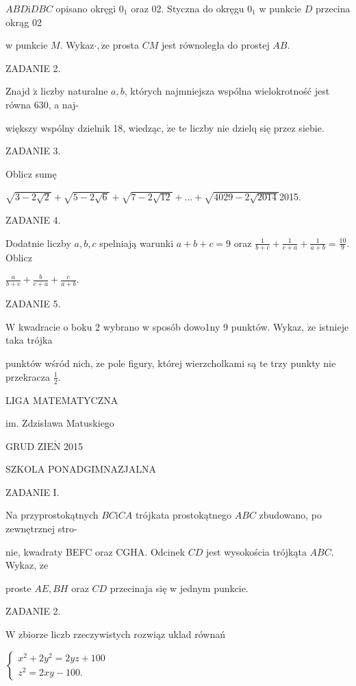 \documentclass[a4paper,12pt]{article}
\begin{document}
$ABD\mathrm{i}DBC$ opisano okręgi $0_{1}$ oraz 02. Styczna do okręgu $0_{1}$ w punkcie $D$ przecina okrąg 02

w punkcie $M$. Wykaz$\cdot, \dot{\mathrm{z}}\mathrm{e}$ prosta $CM$ jest równoległa do prostej $AB.$

ZADANIE 2.

Znajd $\acute{\mathrm{z}}$ liczby naturalne $a, b$, których najmniejsza wspólna wielokrotność jest równa 630, a naj-

większy wspólny dzielnik 18, wiedząc, $\dot{\mathrm{z}}\mathrm{e}$ te liczby nie dzielq się przez siebie.

ZADANIE 3.

Oblicz sumę

$\sqrt{3-2\sqrt{2}}+\sqrt{5-2\sqrt{6}}+\sqrt{7-2\sqrt{12}}+\ldots+\sqrt{4029-2\sqrt{2014}}$2015.

ZADANIE 4.

Dodatnie liczby $a, b, c$ spelniają warunki $a+b+c=9$ oraz $\displaystyle \frac{1}{b+c}+\frac{1}{c+a}+\frac{1}{a+b}=\frac{10}{9}$. Oblicz

$\displaystyle \frac{a}{b+c}+\frac{b}{c+a}+\frac{c}{a+b}.$

ZADANIE 5.

$\mathrm{W}$ kwadracie o boku 2 wybrano w sposób dowo1ny 9 punktów. Wykaz, $\dot{\mathrm{z}}\mathrm{e}$ istnieje taka trójka

punktów wśród nich, $\dot{\mathrm{z}}\mathrm{e}$ pole figury, której wierzcholkami są te trzy punkty nie przekracza $\displaystyle \frac{1}{2}.$






LIGA MATEMATYCZNA

im. Zdzisława Matuskiego

GRUD Z$\mathrm{I}\mathrm{E}\acute{\mathrm{N}}$ 2015

SZKOLA PONADGIMNAZJALNA

ZADANIE I.

Na przyprostokątnych $BC\mathrm{i}CA$ trójkata prostokątnego $ABC$ zbudowano, po zewnętrznej stro-

nie, kwadraty BEFC oraz CGHA. Odcinek $CD$ jest wysokościa trójkąta $ABC$. Wykaz, $\dot{\mathrm{z}}\mathrm{e}$

proste $AE, BH$ oraz $CD$ przecinaja się w jednym punkcie.

ZADANIE 2.

$\mathrm{W}$ zbiorze liczb rzeczywistych rozwiąz uklad równań

$\left\{\begin{array}{l}
x^{2}+2y^{2}=2yz+100\\
z^{2}=2xy-100.
\end{array}\right.$
\end{document}
